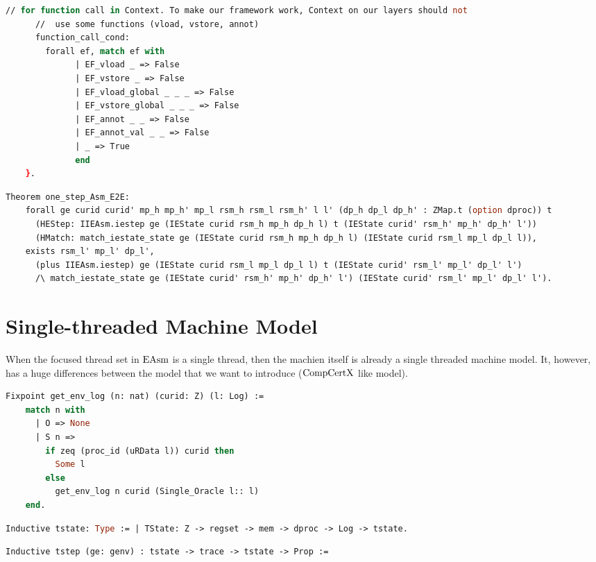 \begin{lstlisting}[language=Caml]
      // for function call in Context. To make our framework work, Context on our layers should not 
      //  use some functions (vload, vstore, annot) 
      function_call_cond:
        forall ef, match ef with
              | EF_vload _ => False
              | EF_vstore _ => False
              | EF_vload_global _ _ _ => False
              | EF_vstore_global _ _ _ => False
              | EF_annot _ _ => False
              | EF_annot_val _ _ => False
              | _ => True
              end
    }.
\end{lstlisting}

\begin{lstlisting}[language=Caml]
  Theorem one_step_Asm_E2E:
    forall ge curid curid' mp_h mp_h' mp_l rsm_h rsm_l rsm_h' l l' (dp_h dp_l dp_h' : ZMap.t (option dproc)) t
      (HEStep: IIEAsm.iestep ge (IEState curid rsm_h mp_h dp_h l) t (IEState curid' rsm_h' mp_h' dp_h' l'))
      (HMatch: match_iestate_state ge (IEState curid rsm_h mp_h dp_h l) (IEState curid rsm_l mp_l dp_l l)),
    exists rsm_l' mp_l' dp_l',
      (plus IIEAsm.iestep) ge (IEState curid rsm_l mp_l dp_l l) t (IEState curid' rsm_l' mp_l' dp_l' l')
      /\ match_iestate_state ge (IEState curid' rsm_h' mp_h' dp_h' l') (IEState curid' rsm_l' mp_l' dp_l' l').
\end{lstlisting}

\section{Single-threaded Machine Model}
\label{chapter:linking:subsec:single-threaded-machine-model}
When the focused thread set in $\mathrm{EAsm}$ is a single thread, then the machien itself is 
already a single threaded machine model. 
It, however, has a huge differences between the model that we want to introduce ($\mathrm{CompCertX}$ like model).

\begin{lstlisting}[language=Caml]
  Fixpoint get_env_log (n: nat) (curid: Z) (l: Log) :=
    match n with
      | O => None
      | S n =>
        if zeq (proc_id (uRData l)) curid then
          Some l
        else
          get_env_log n curid (Single_Oracle l:: l)
    end.
\end{lstlisting}

\begin{lstlisting}[language=Caml]
  Inductive tstate: Type := | TState: Z -> regset -> mem -> dproc -> Log -> tstate.
\end{lstlisting}


\begin{lstlisting}[language=Caml]
  Inductive tstep (ge: genv) : tstate -> trace -> tstate -> Prop :=
\end{lstlisting}

